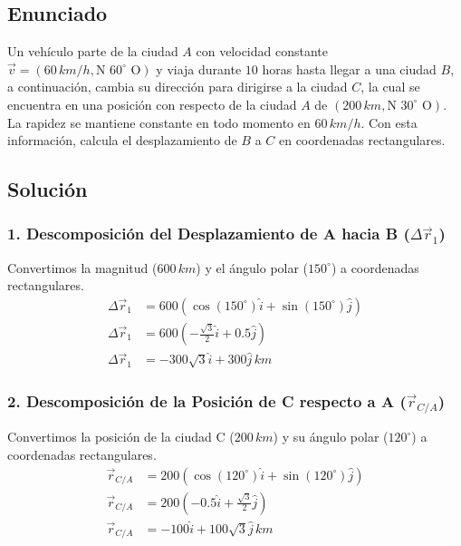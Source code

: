 \documentclass[12pt, a4paper]{article}
\begin{document}
\newpage

\subsection*{Enunciado}
Un vehículo parte de la ciudad $A$ con velocidad constante $\vec{v} = (60 \, \si{km/h}, \text{N } 60^\circ \text{ O})$ y viaja durante $10$ horas hasta llegar a una ciudad $B$, a continuación, cambia su dirección para dirigirse a la ciudad $C$, la cual se encuentra en una posición con respecto de la ciudad $A$ de $(200 \, \si{km}, \text{N } 30^\circ \text{ O})$. La rapidez se mantiene constante en todo momento en $60 \, \si{km/h}$. Con esta información, calcula el desplazamiento de $B$ a $C$ en coordenadas rectangulares.

\subsection*{Solución}

\subsubsection*{1. Descomposición del Desplazamiento de A hacia B ($\Delta\vec{r}_1$)}
Convertimos la magnitud ($600 \, \si{km}$) y el ángulo polar ($150^\circ$) a coordenadas rectangulares.
\begin{align*}
    \Delta\vec{r}_1 &= 600 (\cos(150^\circ) \hat{i} + \sin(150^\circ) \hat{j}) \\
    \Delta\vec{r}_1 &= 600 \left(-\frac{\sqrt{3}}{2} \hat{i} + 0.5 \hat{j}\right) \\
    \Delta\vec{r}_1 &= -300\sqrt{3}\hat{i} + 300\hat{j} \, \si{km}
\end{align*}

\subsubsection*{2. Descomposición de la Posición de C respecto a A ($\vec{r}_{C/A}$)}
Convertimos la posición de la ciudad C ($200 \, \si{km}$) y su ángulo polar ($120^\circ$) a coordenadas rectangulares.
\begin{align*}
    \vec{r}_{C/A} &= 200 (\cos(120^\circ) \hat{i} + \sin(120^\circ) \hat{j}) \\
    \vec{r}_{C/A} &= 200 \left(-0.5 \hat{i} + \frac{\sqrt{3}}{2} \hat{j}\right) \\
    \vec{r}_{C/A} &= -100\hat{i} + 100\sqrt{3}\hat{j} \, \si{km}
\end{align*}
\end{document}
